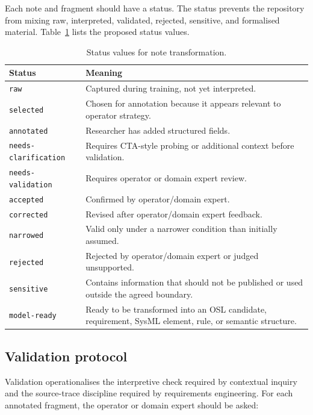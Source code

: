 Each note and fragment should have a status. The status prevents the repository from mixing raw, interpreted, validated, rejected, sensitive, and formalised material. Table~\ref{tab:status-model} lists the proposed status values.

\begin{table}[htbp]
\centering
\caption{Status values for note transformation.}
\label{tab:status-model}
\begin{tabularx}{\textwidth}{p{}X}
\toprule
Status & Meaning \\
\midrule
\texttt{raw} & Captured during training, not yet interpreted. \\
\texttt{selected} & Chosen for annotation because it appears relevant to operator strategy. \\
\texttt{annotated} & Researcher has added structured fields. \\
\texttt{needs-clarification} & Requires CTA-style probing or additional context before validation. \\
\texttt{needs-validation} & Requires operator or domain expert review. \\
\texttt{accepted} & Confirmed by operator/domain expert. \\
\texttt{corrected} & Revised after operator/domain expert feedback. \\
\texttt{narrowed} & Valid only under a narrower condition than initially assumed. \\
\texttt{rejected} & Rejected by operator/domain expert or judged unsupported. \\
\texttt{sensitive} & Contains information that should not be published or used outside the agreed boundary. \\
\texttt{model-ready} & Ready to be transformed into an OSL candidate, requirement, SysML element, rule, or semantic structure. \\
\bottomrule
\end{tabularx}
\end{table}

\subsection{Validation protocol}

Validation operationalises the interpretive check required by contextual inquiry and the source-trace discipline required by requirements engineering. For each annotated fragment, the operator or domain expert should be asked:

